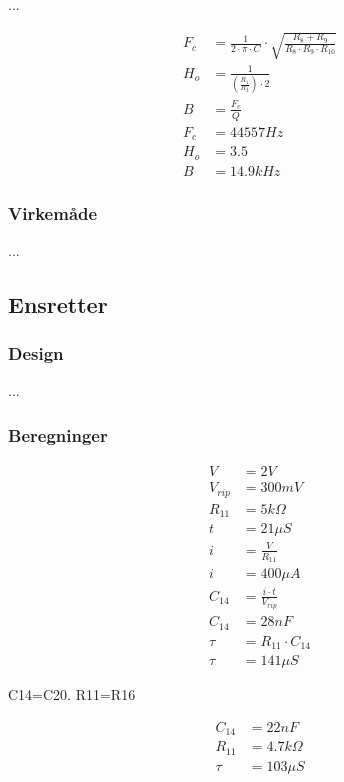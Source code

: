 ...

\begin{equation}
\label{FilterAendringer}
\begin{split}
F_c & = \frac{1}{2 \cdot \pi \cdot C} \cdot \sqrt{\frac{R_8+R_9}{R_8 \cdot R_9 \cdot R_{10}}} \\
H_o & = \frac{1}{\left( \frac{R_1}{R_3} \right) \cdot 2} \\
B & = \frac{F_c}{Q} \\
F_c & = 44557Hz \\
H_o & = 3.5 \\
B & = 14.9kHz
\end{split}
\end{equation}

\subsubsection{Virkemåde}
...

\subsection{Ensretter}

\subsubsection{Design}
...
\subsubsection{Beregninger}

\begin{equation}
\label{eq:EnsretterKondensator}
\begin{split}
V & = 2V \\
V_{rip} & = 300mV \\
R_{11} & = 5k \Omega \\
t & = 21 \mu S \\
i & = \frac{V}{R_{11}} \\
i & = 400 \mu A \\
C_{14} & = \frac{i \cdot t}{V_{rip} }\\
C_{14} & = 28nF \\
\tau & = R_{11} \cdot C_{14} \\
\tau & = 141 \mu S
\end{split}
\end{equation}

C14=C20. R11=R16

\begin{equation}
\label{eq:EnsretterKondensatorTilnaermelse}
\begin{split}
C_{14} & = 22nF \\
R_{11} & = 4.7k \Omega \\
\tau & = 103 \mu S
\end{split}
\end{equation}

